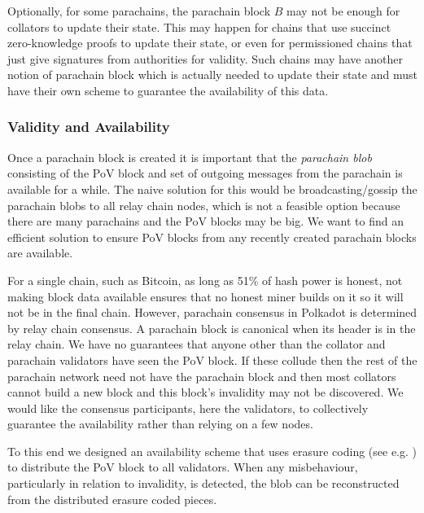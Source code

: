 \documentclass{article}
\begin{document}
Optionally, for some parachains, the parachain block $B$ may not be enough for collators to update their state. This may happen for chains that use succinct zero-knowledge proofs to update their state, or even for permissioned chains that just give signatures from authorities for validity. Such chains may have another notion of parachain block which is actually needed to update their state and must have their own scheme to guarantee the availability of this data.





\subsubsection{Validity and Availability} \label{sec:validity-and-availability}
Once a parachain block is created it is important that the {\em parachain blob} consisting of the PoV block and set of outgoing messages from the parachain is available for a while.
The naive solution for this would be broadcasting/gossip the parachain blobs to all relay chain nodes, which is not a feasible option because there are many parachains and the PoV blocks may be big. We want to find an efficient solution to ensure PoV blocks from any recently created parachain blocks are available.

For a single chain, such as Bitcoin, as long as 51\% of hash power is honest, not making block data available ensures that no honest miner builds on it so it will not be in the final chain. However, parachain consensus in Polkadot is determined by relay chain consensus.
A parachain block is canonical when its header is in the relay chain.
We have no guarantees that anyone other than the collator and parachain validators have seen the PoV block.
If these collude then the rest of the parachain network need not have the parachain block and then most collators cannot build a new block and this block's invalidity may not be discovered. We would like the consensus participants, here the validators, to collectively guarantee the availability rather than relying on a few nodes.

To this end we designed an availability scheme that uses erasure coding (see e.g. \cite{availabilityETH2}) to distribute the PoV block to all validators.
When any misbehaviour, particularly in relation to invalidity, is detected, the blob can be reconstructed from the distributed erasure coded pieces.
\end{document}
